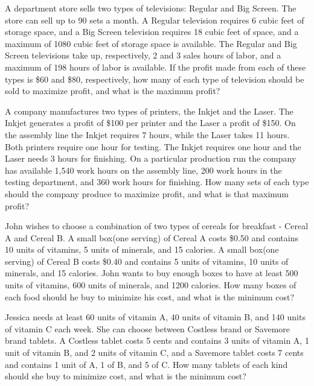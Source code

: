 \begin{puzzle}
    A department store sells two types of televisions: Regular and Big Screen. The store can sell up
    to 90 sets a month. A Regular television requires 6 cubic feet of storage space, and a Big Screen
    television requires 18 cubic feet of space, and a maximum of 1080 cubic feet of storage space is
    available. The Regular and Big Screen televisions take up, respectively, 2 and 3 sales hours of
    labor, and a maximum of 198 hours of labor is available. If the profit made from each of these
    types is \$60 and \$80, respectively, how many of each type of television should be sold to maximize
    profit, and what is the maximum profit?

\end{puzzle}

\begin{puzzle}
    A company manufactures two types of printers, the Inkjet and the Laser. The Inkjet generates a
    profit of \$100 per printer and the Laser a profit of \$150. On the assembly line the Inkjet requires 7
    hours, while the Laser takes 11 hours. Both printers require one hour for testing. The Inkjet requires
    one hour and the Laser needs 3 hours for finishing. On a particular production run the company
    has available 1,540 work hours on the assembly line, 200 work hours in the testing department, and
    360 work hours for finishing. How many sets of each type should the company produce to maximize
    profit, and what is that maximum profit?
\end{puzzle}

\begin{puzzle}
    John wishes to choose a combination of two types of cereals for breakfast - Cereal A and Cereal
    B. A small box(one serving) of Cereal A costs \$0.50 and contains 10 units of vitamins, 5 units of
    minerals, and 15 calories. A small box(one serving) of Cereal B costs \$0.40 and contains 5 units
    of vitamins, 10 units of minerals, and 15 calories. John wants to buy enough boxes to have at
    least 500 units of vitamins, 600 units of minerals, and 1200 calories. How many boxes of each food
    should he buy to minimize his cost, and what is the minimum cost?
\end{puzzle}

\begin{puzzle}
    Jessica needs at least 60 units of vitamin A, 40 units of vitamin B, and 140 units of vitamin C
    each week. She can choose between Costless brand or Savemore brand tablets. A Costless tablet
    costs 5 cents and contains 3 units of vitamin A, 1 unit of vitamin B, and 2 units of vitamin C, and
    a Savemore tablet costs 7 cents and contains 1 unit of A, 1 of B, and 5 of C. How many tablets of
    each kind should she buy to minimize cost, and what is the minimum cost?
\end{puzzle}


